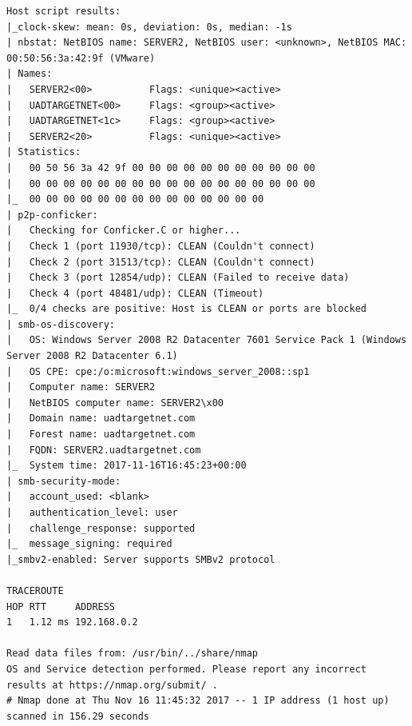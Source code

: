\documentclass[12pt,a4paper]{article}
\begin{document}
\begin{appendices}
\begin{lstlisting}
Host script results:
|_clock-skew: mean: 0s, deviation: 0s, median: -1s
| nbstat: NetBIOS name: SERVER2, NetBIOS user: <unknown>, NetBIOS MAC: 00:50:56:3a:42:9f (VMware)
| Names:
|   SERVER2<00>          Flags: <unique><active>
|   UADTARGETNET<00>     Flags: <group><active>
|   UADTARGETNET<1c>     Flags: <group><active>
|   SERVER2<20>          Flags: <unique><active>
| Statistics:
|   00 50 56 3a 42 9f 00 00 00 00 00 00 00 00 00 00 00
|   00 00 00 00 00 00 00 00 00 00 00 00 00 00 00 00 00
|_  00 00 00 00 00 00 00 00 00 00 00 00 00 00
| p2p-conficker:
|   Checking for Conficker.C or higher...
|   Check 1 (port 11930/tcp): CLEAN (Couldn't connect)
|   Check 2 (port 31513/tcp): CLEAN (Couldn't connect)
|   Check 3 (port 12854/udp): CLEAN (Failed to receive data)
|   Check 4 (port 48481/udp): CLEAN (Timeout)
|_  0/4 checks are positive: Host is CLEAN or ports are blocked
| smb-os-discovery:
|   OS: Windows Server 2008 R2 Datacenter 7601 Service Pack 1 (Windows Server 2008 R2 Datacenter 6.1)
|   OS CPE: cpe:/o:microsoft:windows_server_2008::sp1
|   Computer name: SERVER2
|   NetBIOS computer name: SERVER2\x00
|   Domain name: uadtargetnet.com
|   Forest name: uadtargetnet.com
|   FQDN: SERVER2.uadtargetnet.com
|_  System time: 2017-11-16T16:45:23+00:00
| smb-security-mode:
|   account_used: <blank>
|   authentication_level: user
|   challenge_response: supported
|_  message_signing: required
|_smbv2-enabled: Server supports SMBv2 protocol

TRACEROUTE
HOP RTT     ADDRESS
1   1.12 ms 192.168.0.2

Read data files from: /usr/bin/../share/nmap
OS and Service detection performed. Please report any incorrect results at https://nmap.org/submit/ .
# Nmap done at Thu Nov 16 11:45:32 2017 -- 1 IP address (1 host up) scanned in 156.29 seconds
		\end{lstlisting}

\end{appendices}
\end{document}

